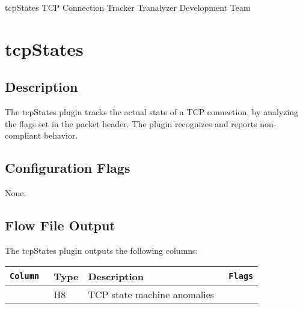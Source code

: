 \documentclass[documentation]{subfiles}
\begin{document}
\trantitle
    {tcpStates}
    {TCP Connection Tracker}
    {Tranalyzer Development Team} %

\section{tcpStates}\label{s:tcpStates}

\subsection{Description}
The tcpStates plugin tracks the actual state of a TCP connection, by analyzing the flags set in the packet header. The plugin recognizes and reports non-compliant behavior.

\subsection{Configuration Flags}
None.

\subsection{Flow File Output}
The tcpStates plugin outputs the following columns:
\begin{longtable}{>{\tt}lll>{\tt\small}l}
    \toprule
    {\bf Column} & {\bf Type} & {\bf Description} & {\bf Flags}\\
    \midrule\endhead%
    \nameref{tcpStatesAFlags} & H8 & TCP state machine anomalies & \\
    \bottomrule
\end{longtable}
\end{document}
